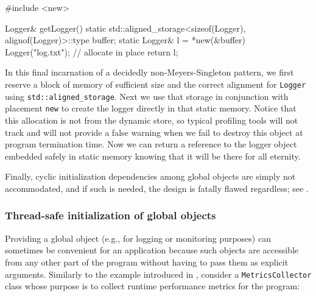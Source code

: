 \begin{emcppslisting}[emcppsbatch=e13]
#include <new>

Logger& getLogger()
{
    static std::aligned_storage<sizeof(Logger), alignof(Logger)>::type buffer;
    static Logger& l = *new(&buffer) Logger("log.txt");  // allocate in place
    return l;
}
\end{emcppslisting}

\noindent In this final incarnation of a decidedly non-Meyers-Singleton pattern,
we first reserve a block of memory of sufficient size and the correct
alignment for \lstinline!Logger! using \linebreak[4]%
\lstinline!std::aligned_storage!. Next
we use that storage in conjunction with placement \lstinline!new! to create
the logger directly in that static memory. Notice that this allocation
is not from the dynamic store, so typical profiling tools will not track
and will not provide a false warning when we fail to destroy this object
at program termination time. Now we can return a reference to the logger
object embedded safely in static memory knowing that it will be there
for all eternity.

Finally, cyclic initialization dependencies among global objects are
simply not accommodated, and if such is needed, the design is fatally
flawed regardless; see .

\subsubsection[Thread-safe initialization of global objects]{Thread-safe initialization of global objects}\label{thread-safe-initialization-of-global-objects}

Providing a global object (e.g., for logging or monitoring purposes) can
sometimes be convenient for an application because such objects are
accessible from any other part of the program without having to pass
them as explicit arguments. Similarly to the example introduced in , consider a
\lstinline!MetricsCollector! class whose purpose is to collect runtime
performance metrics for the program:

